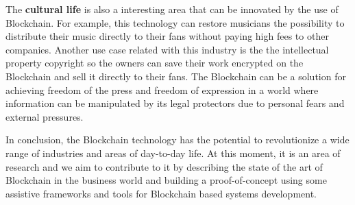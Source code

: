 The \textbf{cultural life} is also a interesting area that can be innovated by the use of Blockchain. For example, this technology can restore musicians the possibility to distribute their music directly to their fans without paying high fees to other companies. Another use case related with this industry is the the intellectual property copyright so the owners can save their work encrypted on the Blockchain and sell it directly to their fans. The Blockchain can be a solution for achieving freedom of the press and freedom of expression in a world where information can be manipulated by its legal protectors due to personal fears and 
external pressures.

In conclusion, the Blockchain technology has the potential to revolutionize a wide range of industries and areas of day-to-day life. At this moment, it is an area of research and we aim to contribute to it by describing the state of the art of Blockchain in the business world and building a proof-of-concept using some assistive frameworks and tools for Blockchain based systems development.








 

